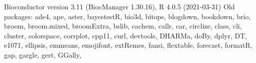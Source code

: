 \documentclass[
]{book}
\newenvironment{Shaded}{\begin{snugshade}}{\end{snugshade}}
\newcommand{\DecValTok}[1]{\textcolor[rgb]{0.00,0.00,0.81}{#1}}
\newcommand{\FloatTok}[1]{\textcolor[rgb]{0.00,0.00,0.81}{#1}}
\newcommand{\NormalTok}[1]{#1}
\newcommand{\SpecialCharTok}[1]{\textcolor[rgb]{0.00,0.00,0.00}{#1}}
\newcommand{\StringTok}[1]{\textcolor[rgb]{0.31,0.60,0.02}{#1}}
\begin{document}
\begin{Shaded}
\begin{Highlighting}[]
\NormalTok{Bioconductor version }\FloatTok{3.11}\NormalTok{ (BiocManager }\DecValTok{1}\NormalTok{.}\FloatTok{30.16}\NormalTok{), R }\DecValTok{4}\NormalTok{.}\FloatTok{0.5}\NormalTok{ (}\DecValTok{2021{-}03{-}31}\NormalTok{)}
\NormalTok{Old packages}\SpecialCharTok{:} \StringTok{\textquotesingle{}ade4\textquotesingle{}}\NormalTok{, }\StringTok{\textquotesingle{}ape\textquotesingle{}}\NormalTok{, }\StringTok{\textquotesingle{}aster\textquotesingle{}}\NormalTok{, }\StringTok{\textquotesingle{}bayestestR\textquotesingle{}}\NormalTok{, }\StringTok{\textquotesingle{}bio3d\textquotesingle{}}\NormalTok{, }\StringTok{\textquotesingle{}bitops\textquotesingle{}}\NormalTok{, }\StringTok{\textquotesingle{}blogdown\textquotesingle{}}\NormalTok{,}
  \StringTok{\textquotesingle{}bookdown\textquotesingle{}}\NormalTok{, }\StringTok{\textquotesingle{}brio\textquotesingle{}}\NormalTok{, }\StringTok{\textquotesingle{}broom\textquotesingle{}}\NormalTok{, }\StringTok{\textquotesingle{}broom.mixed\textquotesingle{}}\NormalTok{, }\StringTok{\textquotesingle{}broomExtra\textquotesingle{}}\NormalTok{, }\StringTok{\textquotesingle{}bslib\textquotesingle{}}\NormalTok{, }\StringTok{\textquotesingle{}cachem\textquotesingle{}}\NormalTok{, }\StringTok{\textquotesingle{}callr\textquotesingle{}}\NormalTok{,}
  \StringTok{\textquotesingle{}car\textquotesingle{}}\NormalTok{, }\StringTok{\textquotesingle{}circlize\textquotesingle{}}\NormalTok{, }\StringTok{\textquotesingle{}class\textquotesingle{}}\NormalTok{, }\StringTok{\textquotesingle{}cli\textquotesingle{}}\NormalTok{, }\StringTok{\textquotesingle{}cluster\textquotesingle{}}\NormalTok{, }\StringTok{\textquotesingle{}colorspace\textquotesingle{}}\NormalTok{, }\StringTok{\textquotesingle{}corrplot\textquotesingle{}}\NormalTok{, }\StringTok{\textquotesingle{}cpp11\textquotesingle{}}\NormalTok{, }\StringTok{\textquotesingle{}curl\textquotesingle{}}\NormalTok{,}
  \StringTok{\textquotesingle{}devtools\textquotesingle{}}\NormalTok{, }\StringTok{\textquotesingle{}DHARMa\textquotesingle{}}\NormalTok{, }\StringTok{\textquotesingle{}doBy\textquotesingle{}}\NormalTok{, }\StringTok{\textquotesingle{}dplyr\textquotesingle{}}\NormalTok{, }\StringTok{\textquotesingle{}DT\textquotesingle{}}\NormalTok{, }\StringTok{\textquotesingle{}e1071\textquotesingle{}}\NormalTok{, }\StringTok{\textquotesingle{}ellipsis\textquotesingle{}}\NormalTok{, }\StringTok{\textquotesingle{}emmeans\textquotesingle{}}\NormalTok{, }\StringTok{\textquotesingle{}emojifont\textquotesingle{}}\NormalTok{,}
  \StringTok{\textquotesingle{}extRemes\textquotesingle{}}\NormalTok{, }\StringTok{\textquotesingle{}fansi\textquotesingle{}}\NormalTok{, }\StringTok{\textquotesingle{}flextable\textquotesingle{}}\NormalTok{, }\StringTok{\textquotesingle{}forecast\textquotesingle{}}\NormalTok{, }\StringTok{\textquotesingle{}formatR\textquotesingle{}}\NormalTok{, }\StringTok{\textquotesingle{}gap\textquotesingle{}}\NormalTok{, }\StringTok{\textquotesingle{}gargle\textquotesingle{}}\NormalTok{, }\StringTok{\textquotesingle{}gert\textquotesingle{}}\NormalTok{, }\StringTok{\textquotesingle{}GGally\textquotesingle{}}\NormalTok{,}

\end{Highlighting}
\end{Shaded}
\end{document}
